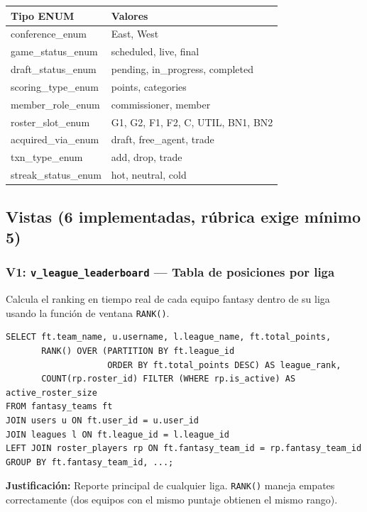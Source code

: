 \documentclass[12pt,a4paper]{article}
\begin{document}
\begin{longtable}{>{\ttfamily\small}p{4cm} p{9cm}}
\toprule
\normalfont\textbf{Tipo ENUM} & \textbf{Valores} \\
\midrule
\endhead
conference\_enum & East, West \\
game\_status\_enum & scheduled, live, final \\
draft\_status\_enum & pending, in\_progress, completed \\
scoring\_type\_enum & points, categories \\
member\_role\_enum & commissioner, member \\
roster\_slot\_enum & G1, G2, F1, F2, C, UTIL, BN1, BN2 \\
acquired\_via\_enum & draft, free\_agent, trade \\
txn\_type\_enum & add, drop, trade \\
streak\_status\_enum & hot, neutral, cold \\
\bottomrule
\end{longtable}

\subsection{Vistas (6 implementadas, r\'ubrica exige m\'inimo 5)}

\subsubsection{V1: \texttt{v\_league\_leaderboard} --- Tabla de posiciones por liga}

Calcula el ranking en tiempo real de cada equipo fantasy dentro de su liga usando
la funci\'on de ventana \texttt{RANK()}.

\begin{lstlisting}
SELECT ft.team_name, u.username, l.league_name, ft.total_points,
       RANK() OVER (PARTITION BY ft.league_id
                    ORDER BY ft.total_points DESC) AS league_rank,
       COUNT(rp.roster_id) FILTER (WHERE rp.is_active) AS active_roster_size
FROM fantasy_teams ft
JOIN users u ON ft.user_id = u.user_id
JOIN leagues l ON ft.league_id = l.league_id
LEFT JOIN roster_players rp ON ft.fantasy_team_id = rp.fantasy_team_id
GROUP BY ft.fantasy_team_id, ...;
\end{lstlisting}

\textbf{Justificaci\'on:} Reporte principal de cualquier liga. \texttt{RANK()} maneja empates correctamente
(dos equipos con el mismo puntaje obtienen el mismo rango).
\end{document}
